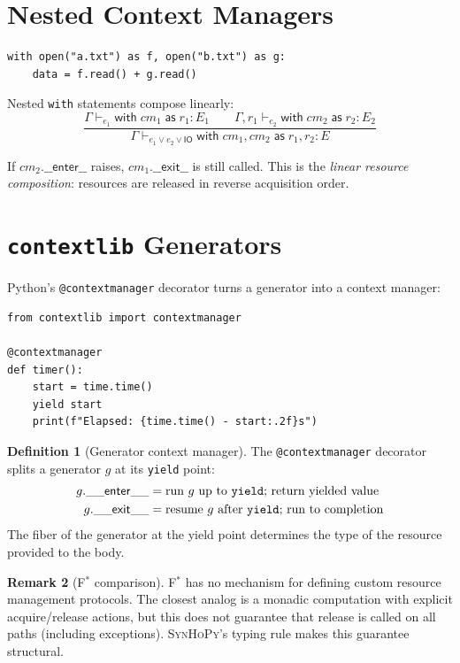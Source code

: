 \documentclass[11pt,a4paper]{report}
\theoremstyle{definition}
\newtheorem{definition}{Definition}[chapter]
\newtheorem{remark}[definition]{Remark}
\theoremstyle{plain}
\newcommand{\IO}{\mathsf{IO}}
\newcommand{\fstar}{F$^{*}$}
\newcommand{\synhopy}{\textsc{SynHoPy}}
\begin{document}
\section{Nested Context Managers}

\begin{lstlisting}[style=python]
with open("a.txt") as f, open("b.txt") as g:
    data = f.read() + g.read()
\end{lstlisting}

Nested \texttt{with} statements compose linearly:
\[
  \frac{
    \Gamma \vdash_{e_1} \mathsf{with}\;cm_1\;\mathsf{as}\;r_1: E_1 \qquad
    \Gamma, r_1 \vdash_{e_2} \mathsf{with}\;cm_2\;\mathsf{as}\;r_2: E_2
  }{
    \Gamma \vdash_{e_1 \vee e_2 \vee \IO}
      \mathsf{with}\;cm_1, cm_2\;\mathsf{as}\;r_1, r_2: E
  }
\]

If $cm_2.\mathsf{\_\_enter\_\_}$ raises, $cm_1.\mathsf{\_\_exit\_\_}$ is still called.
This is the \emph{linear resource composition}: resources are released in reverse
acquisition order.

\section{\texttt{contextlib} Generators}

Python's \lstinline[style=python]{@contextmanager} decorator turns a generator
into a context manager:
\begin{lstlisting}[style=python]
from contextlib import contextmanager

@contextmanager
def timer():
    start = time.time()
    yield start
    print(f"Elapsed: {time.time() - start:.2f}s")
\end{lstlisting}

\begin{definition}[Generator context manager]
The \lstinline[style=python]{@contextmanager} decorator splits a generator $g$
at its \texttt{yield} point:
\begin{align}
  g.\mathsf{\_\_enter\_\_} &= \text{run $g$ up to \texttt{yield}; return yielded value} \\
  g.\mathsf{\_\_exit\_\_}  &= \text{resume $g$ after \texttt{yield}; run to completion}
\end{align}
The fiber of the generator at the yield point determines the type of the
resource provided to the body.
\end{definition}

\begin{remark}[\fstar{} comparison]
\fstar{} has no mechanism for defining custom resource management protocols.
The closest analog is a monadic computation with explicit acquire/release
actions, but this does not guarantee that release is called on all paths
(including exceptions).  \synhopy{}'s typing rule makes this guarantee
structural.
\end{remark}
\end{document}

